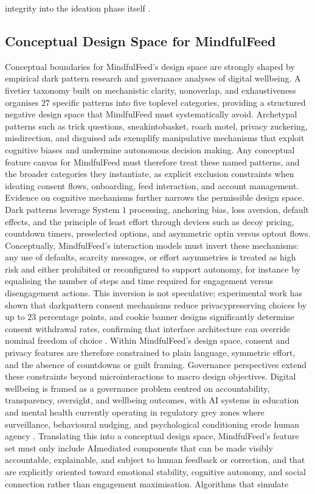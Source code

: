 \documentclass{article}
\begin{document}
integrity into the ideation phase itself \parencites[7]{7808872}[8]{7808872}[19]{8760542}.

\subsection{Conceptual Design Space for MindfulFeed}
\label{sec:conceptual_design_space_mindfulfeed} Conceptual boundaries for MindfulFeed's design space are strongly shaped by empirical dark pattern research and governance analyses of digital well\-being. A five\-tier taxonomy built on mechanistic clarity, non\-overlap, and exhaustiveness organises $27$ specific patterns into five top\-level categories, providing a structured negative design space that MindfulFeed must systematically avoid. Archetypal patterns such as trick questions, sneak\-into\-basket, roach motel, privacy zuckering, misdirection, and disguised ads exemplify manipulative mechanisms that exploit cognitive biases and undermine autonomous decision making. Any conceptual feature canvas for MindfulFeed must therefore treat these named patterns, and the broader categories they instantiate, as explicit exclusion constraints when ideating consent flows, onboarding, feed interaction, and account management. Evidence on cognitive mechanisms further narrows the permissible design space. Dark patterns leverage $ \text{System 1} $ processing, anchoring bias, loss aversion, default effects, and the principle of least effort through devices such as decoy pricing, countdown timers, preselected options, and asymmetric opt\-in versus opt\-out flows. Conceptually, MindfulFeed's interaction models must invert these mechanisms: any use of defaults, scarcity messages, or effort asymmetries is treated as high risk and either prohibited or reconfigured to support autonomy, for instance by equalising the number of steps and time required for engagement versus disengagement actions. This inversion is not speculative; experimental work has shown that dark\-pattern consent mechanisms reduce privacy\-preserving choices by up to $23$ percentage points, and cookie banner designs significantly determine consent withdrawal rates, confirming that interface architecture can override nominal freedom of choice \parencites[2]{4807303}. Within MindfulFeed's design space, consent and privacy features are therefore constrained to plain language, symmetric effort, and the absence of countdowns or guilt framing. Governance perspectives extend these constraints beyond microinteractions to macro design objectives. Digital well\-being is framed as a governance problem centred on accountability, transparency, oversight, and well\-being outcomes, with AI systems in education and mental health currently operating in regulatory grey zones where surveillance, behavioural nudging, and psychological conditioning erode human agency \parencites[2]{7808872}[3]{7808872}. Translating this into a conceptual design space, MindfulFeed's feature set must only include AI\-mediated components that can be made visibly accountable, explainable, and subject to human feedback or correction, and that are explicitly oriented toward emotional stability, cognitive autonomy, and social connection rather than engagement maximisation. Algorithms that simulate 
\end{document}
